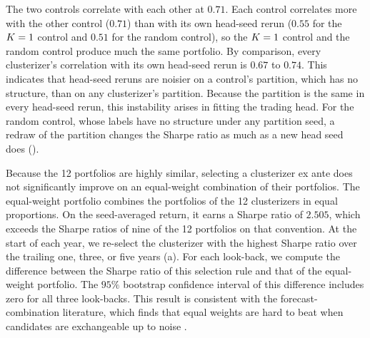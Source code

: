 The two controls correlate with each other at $0.71$. Each control correlates more with the other control ($0.71$) than with its own head-seed rerun ($0.55$ for the $K=1$ control and $0.51$ for the random control), so the $K=1$ control and the random control produce much the same portfolio. By comparison, every clusterizer's correlation with its own head-seed rerun is $0.67$ to $0.74$. This indicates that head-seed reruns are noisier on a control's partition, which has no structure, than on any clusterizer's partition. Because the partition is the same in every head-seed rerun, this instability arises in fitting the trading head. For the random control, whose labels have no structure under any partition seed, a redraw of the partition changes the Sharpe ratio as much as a new head seed does ().

Because the 12 portfolios are highly similar, selecting a clusterizer ex ante does not significantly improve on an equal-weight combination of their portfolios. The equal-weight portfolio combines the portfolios of the 12 clusterizers in equal proportions. On the seed-averaged return, it earns a Sharpe ratio of $2.505$, which exceeds the Sharpe ratios of nine of the 12 portfolios on that convention. At the start of each year, we re-select the clusterizer with the highest Sharpe ratio over the trailing one, three, or five years (a). For each look-back, we compute the difference between the Sharpe ratio of this selection rule and that of the equal-weight portfolio. The $95\%$ bootstrap confidence interval of this difference includes zero for all three look-backs. This result is consistent with the forecast-combination literature, which finds that equal weights are hard to beat when candidates are exchangeable up to noise \citep{timmermann2006forecast}.

